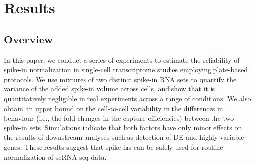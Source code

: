 \documentclass{article}
\begin{document}
% 

\section*{Results}

\subsection*{Overview}
In this paper, we conduct a series of experiments to estimate the reliability of spike-in normalization in single-cell transcriptome studies employing plate-based protocols.
We use mixtures of two distinct spike-in RNA sets to quantify the variance of the added spike-in volume across cells, 
and show that it is quantitatively negligible in real experiments across a range of conditions. 
We also obtain an upper bound on the cell-to-cell variability in the differences in behaviour (i.e., the fold-changes in the capture efficiencies) between the two spike-in sets.
Simulations indicate that both factors have only minor effects on the results of downstream analyses such as detection of DE and highly variable genes.
These results suggest that spike-ins can be safely used for routine normalization of scRNA-seq data.
\end{document}
